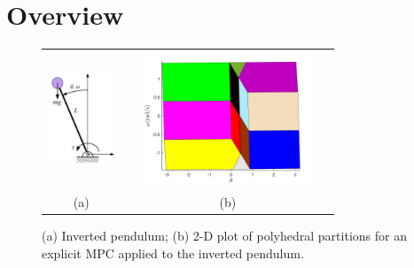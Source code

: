 \section{Overview}\label{sec:example}

% 


\begin{figure}[t]
	\begin{tabular}{cc}
	\includegraphics[width=2cm,height=3cm]{Figs/inv_pend.png}&	\includegraphics[width=6cm,height=4cm]{Figs/regs.jpg}\\
	(a)&(b)
	\end{tabular}
	\caption{(a) Inverted pendulum; (b) 2-D plot of polyhedral partitions for an explicit MPC applied to the inverted pendulum.}
	\label{fig:inverted_pendulum}
\end{figure}


